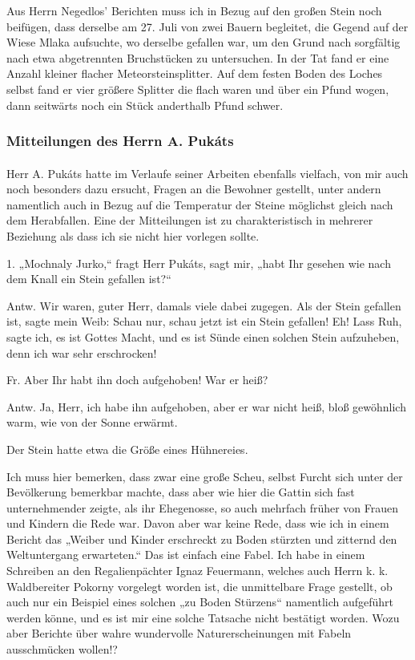 \documentclass[a4paper, 11pt, oneside, german]{article}
\begin{document}
Aus Herrn Negedlos' Berichten muss ich in Bezug auf den großen Stein noch beifügen, dass derselbe am 27. Juli von zwei Bauern begleitet, die Gegend auf der Wiese Mlaka aufsuchte, wo derselbe gefallen war, um den Grund nach sorgfältig nach etwa abgetrennten Bruchstücken zu untersuchen. In der Tat fand er eine Anzahl kleiner flacher Meteorsteinsplitter. Auf dem festen Boden des Loches selbst fand er vier größere Splitter die flach waren und über ein Pfund wogen, dann seitwärts noch ein Stück anderthalb Pfund schwer.
\clearpage
\subsubsection{Mitteilungen des Herrn A. Pukáts}
\paragraph{}
Herr A. Pukáts hatte im Verlaufe seiner Arbeiten ebenfalls vielfach, von mir auch noch besonders dazu ersucht, Fragen an die Bewohner gestellt, unter andern namentlich auch in Bezug auf die Temperatur der Steine möglichst gleich nach dem Herabfallen. Eine der Mitteilungen ist zu charakteristisch in mehrerer Beziehung als dass ich sie nicht hier vorlegen sollte.

1. „Mochnaly Jurko,“ fragt Herr Pukáts, sagt mir, „habt Ihr gesehen wie nach dem Knall ein Stein gefallen ist?“

Antw. Wir waren, guter Herr, damals viele dabei zugegen. Als der Stein gefallen ist, sagte mein Weib: Schau nur, schau jetzt ist ein Stein gefallen! Eh! Lass Ruh, sagte ich, es ist Gottes Macht, und es ist Sünde einen solchen Stein aufzuheben, denn ich war sehr erschrocken!

Fr. Aber Ihr habt ihn doch aufgehoben! War er heiß?

Antw. Ja, Herr, ich habe ihn aufgehoben, aber er war nicht heiß, bloß gewöhnlich warm, wie von der Sonne erwärmt.

Der Stein hatte etwa die Größe eines Hühnereies.

Ich muss hier bemerken, dass zwar eine große Scheu, selbst Furcht sich unter der Bevölkerung bemerkbar machte, dass aber wie hier die Gattin sich fast unternehmender zeigte, als ihr Ehegenosse, so auch mehrfach früher von Frauen und Kindern die Rede war. Davon aber war keine Rede, dass wie ich in einem Bericht das „Weiber und Kinder erschreckt zu Boden stürzten und zitternd den Weltuntergang erwarteten.“ Das ist einfach eine Fabel. Ich habe in einem Schreiben an den Regalienpächter Ignaz Feuermann, welches auch Herrn k. k. Waldbereiter Pokorny vorgelegt worden ist, die unmittelbare Frage gestellt, ob auch nur ein Beispiel eines solchen „zu Boden Stürzens“ namentlich aufgeführt werden könne, und es ist mir eine solche Tatsache nicht bestätigt worden. Wozu aber Berichte über wahre wundervolle Naturerscheinungen mit Fabeln ausschmücken wollen!?
\end{document}
